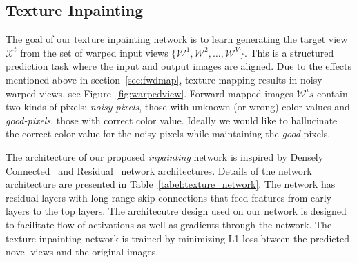 \documentclass[runningheads]{llncs}
\begin{document}
\subsection{Texture Inpainting}
The goal of our texture inpainting network is to learn generating the target view $\mathcal{X}^{t}$ from the set of warped input views $\{\mathcal{W}^{1}, \mathcal{W}^{2}, \dots, \mathcal{W}^{V}\}$. This is a structured prediction task where the input and output images are aligned. Due to the effects mentioned above in section~\ref{sec:fwdmap}, texture mapping results in noisy warped views, see Figure~\ref{fig:warpedview}. Forward-mapped images $\mathcal{W}^{i}s$ contain two kinds of pixels: \textit{noisy-pixels}, those with unknown (or wrong) color values and \textit{good-pixels}, those with correct color value. Ideally we would like to hallucinate the correct color value for the noisy pixels while maintaining the \textit{good} pixels.%

The architecture of our proposed \textit{inpainting} network is inspired by Densely Connected~\cite{huang2017densely} and Residual~\cite{he2016deep} network architectures. Details of the network architecture are presented in Table~\ref{tabel:texture_network}. The network has residual layers with long range skip-connections that feed features from early layers to the top layers. The architecutre design used on our network is designed to facilitate flow of activations as well as gradients through the network. The texture inpainting network is trained by minimizing L1 loss btween the predicted novel views and the original images.
\end{document}
